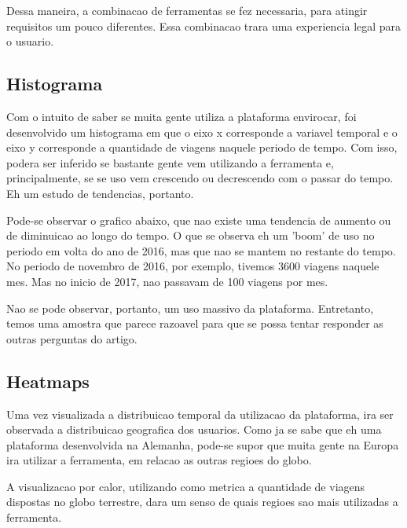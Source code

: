 \documentclass[10pt, conference]{IEEEtran}
\begin{document}
Dessa maneira, a combinacao de ferramentas se fez necessaria, para atingir requisitos um pouco
diferentes. Essa combinacao trara uma experiencia legal para o usuario.

\subsection{Histograma}

Com o intuito de saber se muita gente utiliza a plataforma envirocar, foi desenvolvido
um histograma em que o eixo x corresponde a variavel temporal e o eixo y corresponde
a quantidade de viagens naquele periodo de tempo. Com isso, podera ser inferido se bastante
gente vem utilizando a ferramenta e, principalmente, se se uso vem crescendo ou decrescendo
com o passar do tempo. Eh um estudo de tendencias, portanto.

Pode-se observar o grafico abaixo, que nao existe uma tendencia de aumento ou de diminuicao
ao longo do tempo. O que se observa eh um 'boom' de uso no periodo em volta do ano de 2016,
mas que nao se mantem no restante do tempo. No periodo de novembro de 2016, por exemplo, 
tivemos 3600 viagens naquele mes. Mas no inicio de 2017, nao passavam de 100 viagens por mes.

Nao se pode observar, portanto, um uso massivo da plataforma. Entretanto, temos uma amostra
que parece razoavel para que se possa tentar responder as outras perguntas do artigo.



\subsection{Heatmaps}

Uma vez visualizada a distribuicao temporal da utilizacao da plataforma, ira ser observada a
distribuicao geografica dos usuarios. Como ja se sabe que eh uma plataforma desenvolvida
na Alemanha, pode-se supor que muita gente na Europa ira utilizar a ferramenta, em relacao
as outras regioes do globo.

A visualizacao por calor, utilizando como metrica a quantidade de viagens dispostas no globo
terrestre, dara um senso de quais regioes sao mais utilizadas a ferramenta.
\end{document}
